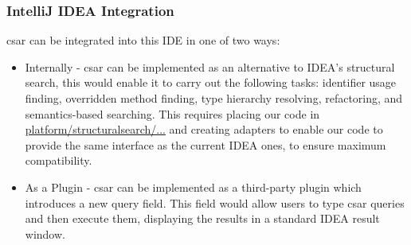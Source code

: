 \documentclass[12pt, letterpaper]{article}
\begin{document}
\subsubsection{IntelliJ IDEA Integration}
csar can be integrated into this IDE in one of two ways:
\begin{itemize}
  \item Internally - csar can be implemented as an alternative to IDEA's structural search,
  this would enable it to carry out the following tasks:
  identifier usage finding, overridden method finding, type hierarchy resolving, refactoring, and semantics-based searching.
  This requires placing our code in \href{https://github.com/JetBrains/intellij-community/tree/master/platform/structuralsearch/source/com/intellij/structuralsearch}{platform/structuralsearch/...} and creating adapters to enable our code to provide the same interface as the current IDEA ones, to ensure maximum compatibility.
  \item As a Plugin - csar can be implemented as a third-party plugin which introduces a new query field.
  This field would allow users to type csar queries and then execute them, displaying the results in a standard IDEA result window.
\end{itemize}
\end{document}
